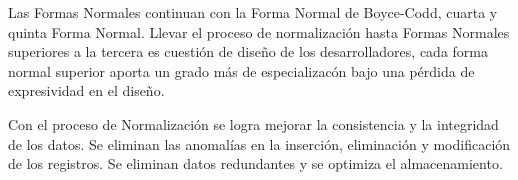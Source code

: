 Las Formas Normales continuan con la Forma Normal de Boyce-Codd, cuarta y quinta Forma Normal. Llevar el proceso 
de normalizaci\'on hasta Formas Normales superiores a la tercera es cuesti\'on de diseño de los desarrolladores, cada forma 
normal superior aporta un grado m\'as de especializac\'on bajo una p\'erdida de expresividad en el diseño.

Con el proceso de Normalización se logra mejorar la consistencia y la integridad de los datos. Se eliminan las anomal\'ias 
en la inserción, eliminaci\'on y modificación de los registros. Se eliminan datos redundantes y se optimiza el almacenamiento.
